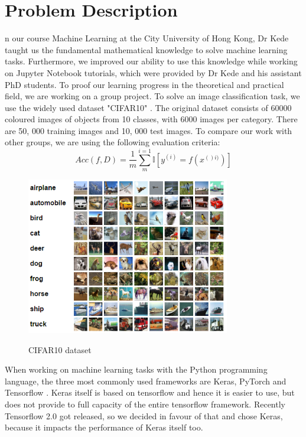 \documentclass[journal]{IEEEtran}
\begin{document}
\section{Problem Description}
\label{sec:problemDescription}
n our course Machine Learning at the City University of Hong Kong, Dr Kede taught us the fundamental mathematical knowledge to solve machine learning tasks. Furthermore, we improved our ability to use this knowledge while working on Jupyter Notebook tutorials, which were provided by Dr Kede and his assistant PhD students. To proof our learning progress in the theoretical and practical field, we are working on a group project. To solve an image classification task, we use the widely used dataset  "CIFAR10" \cite{echersly}\cite{mostpopular}. The original dataset consists of 60000 coloured images of objects from 10 classes, with 6000 images per category. There are 50, 000 training images and 10, 000 test images. To compare our work with other groups, we are using the following evaluation criteria:
\begin{equation}
Acc(f,D) = \frac{1}{m}\sum_{m}^{i=1} \mathbb{I} \left [ y^{(i)} =f(x^{()i)})\right ]
\label{acc}
\end{equation}
\begin{figure}
  \begin{center}
  \includegraphics[width=3.5in]{photo/image32.png}\\
  \caption{CIFAR10 dataset}\label{cifar10}
  \end{center}
\end{figure}
\noindent When working on machine learning tasks with the Python programming language, the three most commonly used frameworks are Keras, PyTorch and Tensorflow \cite{favFrameworks}. Keras itself is based on tensorflow and hence it is easier to use, but does not provide to full capacity of the entire tensorflow framework\cite{DlKeras}. Recently Tensorflow 2.0 got released, so we decided in favour of that and chose Keras, because it impacts the performance of Keras itself too. 
\end{document}
